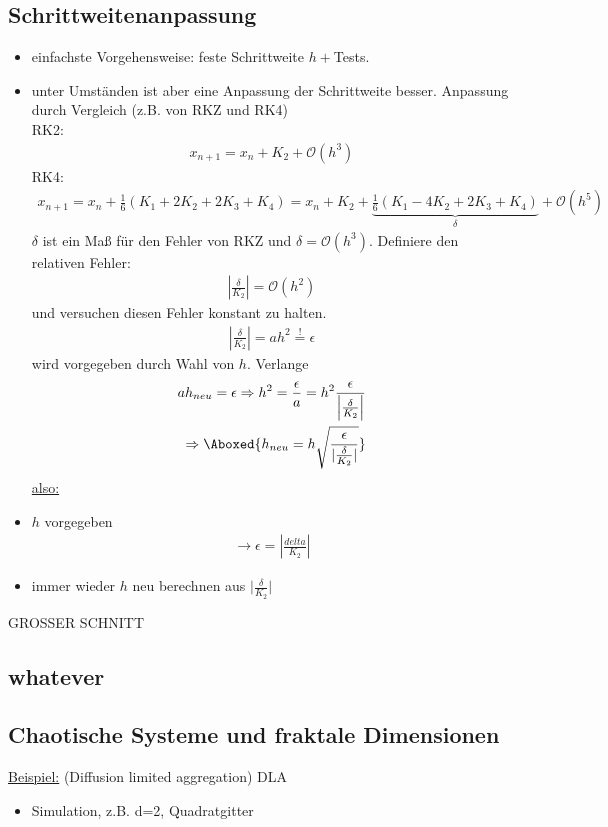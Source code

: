 \documentclass[12pt]{article}
\begin{document}
\subsection{Schrittweitenanpassung}
\begin{itemize}
\item einfachste Vorgehensweise: feste Schrittweite $h +$Tests.
\item unter Umständen ist aber eine Anpassung der Schrittweite besser. Anpassung durch Vergleich (z.B. von RKZ und RK4) \\
RK2: \begin{align}
x_{n+1} = x_n + K_2 + \mathcal{O}(h^3)
\end{align}
RK4: \begin{align}
x_{n+1}= x_n + \frac{1}{6} (K_1 + 2K_2 +2K_3 + K_4) = x_n + K_2 + \underbrace{\frac{1}{6} (K_1 - 4K_2 + 2K_3 +K_4)}_\text{$\delta$} + \mathcal{O}(h^5)
\end{align}
$\delta$ ist ein Maß für den Fehler von RKZ und $\delta= \mathcal{O}(h^3)$. Definiere den relativen Fehler: 
\begin{align}
\left| \frac{\delta}{K_2} \right| = \mathcal{O}(h^2)
\end{align}
und versuchen diesen Fehler konstant zu halten.
\begin{align}
\left| \frac{\delta}{K_2} \right| = a h^2 \overset{!}{=} \epsilon
\end{align}
wird vorgegeben durch Wahl von $h$. Verlange 
\begin{align}
a h_{neu}= \epsilon \Rightarrow h^2 = \frac{\epsilon}{a} = h^2 \frac{\epsilon}{\left| \frac{\delta}{K_2} \right|} \\
\Rightarrow \Aboxed{ h_{neu} = h \sqrt{\frac{\epsilon}{\vert \frac{\delta}{K_2} \vert }}}
\end{align}
\underline{also:}
\item $h$ vorgegeben \begin{align}
\to \epsilon = \left| \frac{delta}{K_2} \right|
\end{align}
\item immer wieder $h$ neu berechnen aus $\vert \frac{ \delta}{K_2} \vert$
\end{itemize}

GROSSER SCHNITT

\subsection{whatever}
\subsection{Chaotische Systeme und fraktale Dimensionen}
\underline{Beispiel:} (Diffusion limited aggregation) DLA
\begin{itemize}
\item Simulation, z.B. d=2, Quadratgitter

\end{itemize} 
\end{document}
